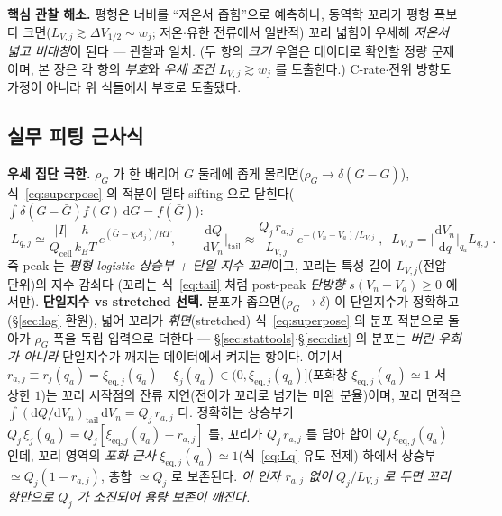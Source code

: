 \documentclass[11pt,a4paper]{article}
\newcommand{\dd}{\mathrm{d}}
\newcommand{\eq}{\mathrm{eq}}
\newcommand{\cell}{\mathrm{cell}}
\begin{document}
\textbf{핵심 관찰 해소.} 평형은 너비를 ``저온서 좁힘''으로 예측하나, 동역학 꼬리가 평형 폭보다 크면($L_{V,j}
\gtrsim\Delta V_{1/2}\sim w_j$; 저온$\cdot$유한 전류에서 일반적) 꼬리 넓힘이 우세해 \emph{저온서 넓고 비대칭}이
된다 — 관찰과 일치. (두 항의 \emph{크기} 우열은 데이터로 확인할 정량 문제이며, 본 장은 각 항의 \emph{부호}와
\emph{우세 조건} $L_{V,j}\gtrsim w_j$ 를 도출한다.) C-rate$\cdot$전위 방향도 가정이 아니라
위 식들에서 부호로 도출됐다.

\subsection{실무 피팅 근사식}
\textbf{우세 집단 극한.} $\rho_G$ 가 한 배리어 $\bar G$ 둘레에 좁게 몰리면($\rho_G\to\delta(G-\bar G)$),
식~\eqref{eq:superpose} 의 적분이 델타 sifting 으로 닫힌다($\int\delta(G-\bar G)f(G)\,\dd G=f(\bar G)$):
\begin{equation}
\boxed{\;L_{q,j}\simeq\frac{|I|}{Q_\cell}\frac{h}{k_BT}\,e^{(\bar G-\chi\mathcal A_j)/RT},\qquad
\frac{\dd Q}{\dd V_n}\Big|_{\text{tail}}\approx\frac{Q_j\,r_{a,j}}{L_{V,j}}\,e^{-(V_n-V_a)/L_{V,j}}\;,\;\;
L_{V,j}=\Big|\frac{\dd V_n}{\dd q}\Big|_{q_a}L_{q,j}\;.}
\label{eq:simplefit}
\end{equation}
즉 peak 는 \emph{평형 logistic 상승부 + 단일 지수 꼬리}이고, 꼬리는 특성 길이 $L_{V,j}$(전압 단위)의 지수 감쇠다
(꼬리는 식~\eqref{eq:tail} 처럼 post-peak \emph{단방향} $s(V_n-V_a)\ge0$ 에서만).
\textbf{단일지수 vs stretched 선택.} 분포가 좁으면($\rho_G\to\delta$) 이 단일지수가 정확하고(\S\ref{sec:lag} 환원),
넓어 꼬리가 \emph{휘면}(stretched) 식~\eqref{eq:superpose} 의 분포 적분으로 돌아가 $\rho_G$ 폭을 독립 입력으로
더한다 — \S\ref{sec:stattools}$\cdot$\S\ref{sec:dist} 의 분포는 \emph{버린 우회가 아니라} 단일지수가 깨지는
데이터에서 켜지는 항이다.
여기서 $r_{a,j}\equiv r_j(q_a)=\xi_{\eq,j}(q_a)-\xi_j(q_a)\in(0,\xi_{\eq,j}(q_a)]$(포화창 $\xi_{\eq,j}(q_a)\simeq1$ 서
상한 $1$)는 꼬리 시작점의 잔류 지연(전이가 꼬리로 넘기는
미완 분율)이며, 꼬리 면적은 $\int(\dd Q/\dd V_n)_{\text{tail}}\,\dd V_n=Q_j\,r_{a,j}$ 다. 정확히는 상승부가
$Q_j\,\xi_j(q_a)=Q_j[\xi_{\eq,j}(q_a)-r_{a,j}]$ 를, 꼬리가 $Q_j\,r_{a,j}$ 를 담아 합이 $Q_j\,\xi_{\eq,j}(q_a)$ 인데,
꼬리 영역의 \emph{포화 근사} $\xi_{\eq,j}(q_a)\simeq1$(식~\eqref{eq:Lq} 유도 전제) 하에서 상승부 $\simeq Q_j(1-r_{a,j})$,
총합 $\simeq Q_j$ 로 보존된다. \emph{이 인자 $r_{a,j}$ 없이 $Q_j/L_{V,j}$ 로 두면 꼬리 항만으로 $Q_j$ 가 소진되어 용량 보존이 깨진다.}
\end{document}
